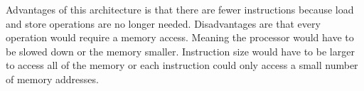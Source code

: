 \documentclass[a4paper]{article}
\begin{document}
\begin{enumerate}
		Advantages of this architecture is that there are fewer instructions because load and store
		operations are no longer needed. Disadvantages are that every operation would require
		a memory access. Meaning the processor would have to be slowed down or the memory
		smaller. Instruction size would have to be larger to access all of the memory or
		each instruction could only access a small number of memory addresses.
	\end{enumerate}
	
\end{document}
